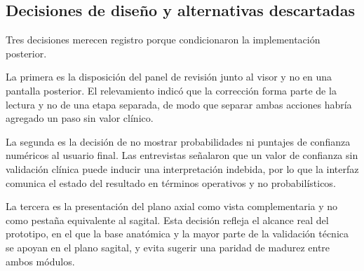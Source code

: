 \subsection{Decisiones de diseño y alternativas descartadas}

Tres decisiones merecen registro porque condicionaron la implementación posterior.

La primera es la disposición del panel de revisión junto al visor y no en una pantalla posterior. El relevamiento indicó que la corrección forma parte de la lectura y no de una etapa separada, de modo que separar ambas acciones habría agregado un paso sin valor clínico.

La segunda es la decisión de no mostrar probabilidades ni puntajes de confianza numéricos al usuario final. Las entrevistas señalaron que un valor de confianza sin validación clínica puede inducir una interpretación indebida, por lo que la interfaz comunica el estado del resultado en términos operativos y no probabilísticos.

La tercera es la presentación del plano axial como vista complementaria y no como pestaña equivalente al sagital. Esta decisión refleja el alcance real del prototipo, en el que la base anatómica y la mayor parte de la validación técnica se apoyan en el plano sagital, y evita sugerir una paridad de madurez entre ambos módulos.
